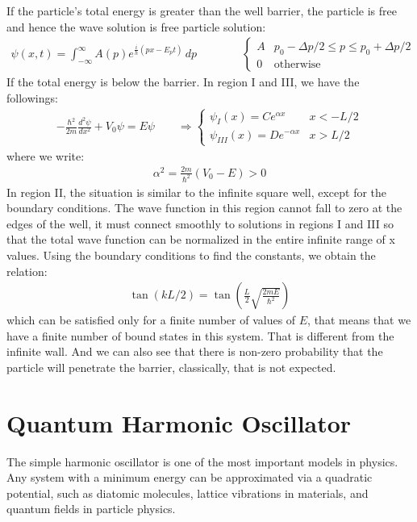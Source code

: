 \documentclass[11pt]{article}
\theoremstyle{break}
\theoremstyle{break}
\begin{document}
If the particle's total energy is greater than the well barrier, the particle is free and hence the wave solution is free particle solution:
\begin{align*}
\psi(x,t) = \int_{-\infty}^\infty A(p) e^{\frac{i}{h}(px-E_p t)}\, dp \qquad\qquad \begin{cases}
A & p_0-\Delta p/2 \leq p \leq p_0 + \Delta p/2\\
0 & \text{otherwise}
\end{cases}
\end{align*}
If the total energy is below the barrier. In region I and III, we have the followings:
\begin{align*}
-\frac{\hbar^2}{2m}\frac{d^2\psi}{dx^2}+V_0 \psi = E\psi \qquad \Rightarrow \begin{cases}
\psi_I(x) = Ce^{\alpha x} & x<-L/2\\
\psi_{III}(x) = De^{-\alpha x} & x>L/2
\end{cases}
\end{align*}
where we write:
\begin{align*}
\alpha^2 = \frac{2m}{\hbar^2}(V_0 - E)>0
\end{align*}
In region II, the situation is similar to the infinite square well, except for the boundary conditions. The wave function in this region cannot fall to zero at the edges of the well, it must connect smoothly to solutions in regions I and III so that the total wave function can be normalized in the entire infinite range of x values. Using the boundary conditions to find the constants, we obtain the relation:
\begin{align*}
\tan(kL/2) = \tan\left( \frac{L}{2}\sqrt{\frac{2mE}{\hbar^2}}\right)
\end{align*}
which can be satisfied only for a finite number of values of $E$, that means that we have a finite number of bound states in this system. That is different from the infinite wall. And we can also see that there is non-zero probability that the particle will penetrate the barrier, classically, that is not expected.\\

\newpage
\section{Quantum Harmonic Oscillator}
The simple harmonic oscillator is one of the most important models in physics. Any system with a minimum energy can be approximated via a quadratic potential, such as diatomic molecules, lattice vibrations in materials, and quantum fields in particle physics.\\
\end{document}
